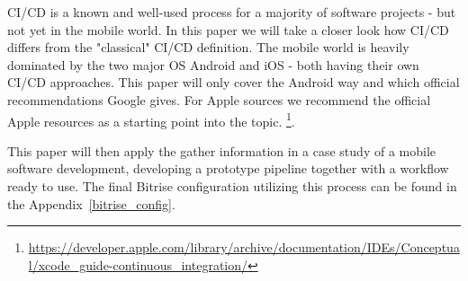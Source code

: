 
CI/CD is a known and well-used process for a majority of software projects - but not yet in the mobile world. In this paper we will take a closer look how CI/CD differs from the "classical" CI/CD definition. The mobile world is heavily dominated by the two major OS Android and iOS - both having their own CI/CD approaches. This paper will only cover the Android way and which official recommendations Google gives. For Apple sources we recommend the official Apple resources as a starting point into the topic.
\footnote{\url{https://developer.apple.com/library/archive/documentation/IDEs/Conceptual/xcode_guide-continuous_integration/}}.

This paper will then apply the gather information in a case study of a mobile software development, developing a prototype pipeline together with a workflow ready to use. The final Bitrise configuration utilizing this process can be found in the Appendix~\ref{bitrise_config}.